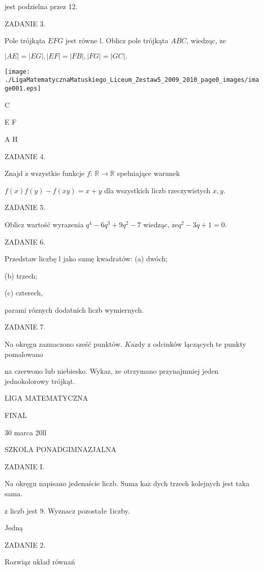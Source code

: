 \documentclass[a4paper,12pt]{article}
\begin{document}
jest podzielna przez 12.

ZADANIE 3.

Pole trójkąta $EFG$ jest równe l. Oblicz pole trójkąta $ABC$, wiedzqc, $\dot{\mathrm{z}}\mathrm{e}$

$|AE|=|EG|,|EF|=|FB|,|FG|=|GC|.$
\begin{center}
\texttt{[image: ./LigaMatematycznaMatuskiego\_Liceum\_Zestaw5\_2009\_2010\_page0\_images/image001.eps]}
\end{center}
C

E  F

A  H

ZADANIE 4.

Znajd $\acute{\mathrm{z}}$ wszystkie funkcje $f$: $\mathbb{R}\rightarrow \mathbb{R}$ spełniające warunek

$f(x)f(y)-f(xy)=x+y$ dla wszystkich liczb rzeczywistych $x, y.$

ZADANIE 5.

Oblicz wartość wyrazenia $q^{4}-6q^{3}+9q^{2}-7$ wiedząc, $\dot{\mathrm{z}}\mathrm{e}q^{2}-3q+1=0.$

ZADANIE 6.

Przedstaw liczbę l jako sumę kwadratów: (a) dwóch;

(b) trzech;

(c) czterech,

parami róznych dodatnich liczb wymiernych.

ZADANIE 7.

Na okręgu zaznaczono sześć punktów. $K\mathrm{a}\dot{\mathrm{z}}\mathrm{d}\mathrm{y}$ z odcinków lączących te punkty pomalowano

na czerwono lub niebiesko. Wykaz, $\dot{\mathrm{z}}\mathrm{e}$ otrzymano przynajmniej jeden jednokolorowy trójkąt.






LIGA MATEMATYCZNA

FINAL

30 marca 20ll

SZKOLA PONADGIMNAZJALNA

ZADANIE I.

Na okręgu napisano jedenaście liczb. Suma $\mathrm{k}\mathrm{a}\dot{\mathrm{z}}$ dych trzech kolejnych jest taka sama.

z liczb jest 9. Wyznacz pozostałe 1iczby.

Jedną

ZADANIE 2.

Rozwiąz uklad równań
\end{document}
